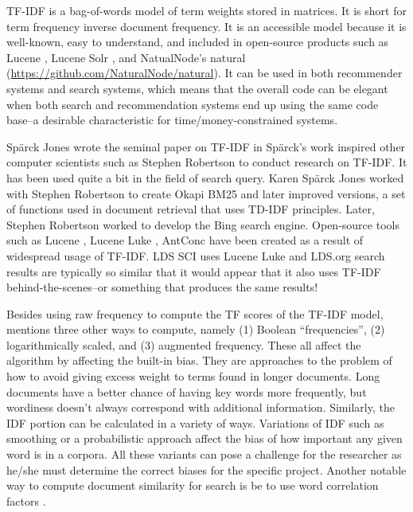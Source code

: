 TF-IDF is a bag-of-words model of term weights stored in matrices. It is short for term frequency inverse document frequency.  It is an accessible model because it is well-known, easy to understand, and included in open-source products such as Lucene \citep{McCandless:2010:LAS:1893016}, Lucene Solr \citep{apache_solr_beginners_guide_2013,apache_solr_enterprise_search_server_2015}, and NatualNode’s natural (\url{https://github.com/NaturalNode/natural}).  It can be used in both recommender systems and search systems, which means that the overall code can be elegant when both search and recommendation systems end up using the same code base--a desirable characteristic for time/money-constrained systems.

Sp\"{a}rck Jones wrote the seminal paper on TF-IDF in \citeyear{sparck1972statistical} \citep{sparck1972statistical}
Sp\"{a}rck’s work inspired other computer scientists such as Stephen Robertson to conduct research on TF-IDF. It has been used quite a bit in the field of search query. Karen Sp\"{a}rck Jones worked with Stephen Robertson to create Okapi BM25 and later improved versions, a set of functions used in document retrieval that uses TD-IDF principles. Later, Stephen Robertson worked to develop the Bing search engine. Open-source tools such as Lucene \citep{McCandless:2010:LAS:1893016}, Lucene Luke \citep{lucene:luke}, AntConc \citep{anthony_2013} have been created as a result of widespread usage of TF-IDF. LDS SCI uses Lucene Luke and LDS.org search results are typically so similar that it would appear that it also uses TF-IDF behind-the-scenes--or something that produces the same results!

Besides using raw frequency to compute the TF scores of the TF-IDF model, \citet{manning_raghavan_2008_scoring} mentions three other ways to compute, namely (1) Boolean ``frequencies'', (2) logarithmically scaled, and (3) augmented frequency. These all affect the algorithm by affecting the built-in bias. They are approaches to the problem of how to avoid giving excess weight to terms found in longer documents. Long documents have a better chance of having key words more frequently, but wordiness doesn’t always correspond with additional information.  Similarly, the IDF portion can be calculated in a variety of ways. Variations of IDF such as smoothing or a probabilistic approach affect the bias of how important any given word is in a corpora. All these variants can pose a challenge for the researcher as he/she must determine the correct biases for the specific project. Another notable way to compute document similarity for search is be to use word correlation factors \citep{won2007using}.

